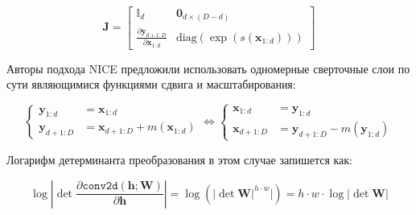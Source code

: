 \begin{equation}
    \mathbf{J} = 
    \begin{bmatrix}
    \mathbb{I}_d & \mathbf{0}_{d\times(D-d)} \\[5pt]
    \frac{\partial \mathbf{y}_{d+1:D}}{\partial \mathbf{x}_{1:d}} & \text{diag}(\exp(s(\mathbf{x}_{1:d})))
    \end{bmatrix}
\end{equation}

Авторы подхода NICE предложили использовать одномерные сверточные слои по сути являющимися функциями сдвига и масштабирования:

\begin{equation}
    \begin{cases}
    \mathbf{y}_{1:d} &= \mathbf{x}_{1:d} \\ 
    \mathbf{y}_{d+1:D} &= \mathbf{x}_{d+1:D} + m(\mathbf{x}_{1:d})
    \end{cases}
    \Leftrightarrow 
    \begin{cases}
    \mathbf{x}_{1:d} &= \mathbf{y}_{1:d} \\ 
    \mathbf{x}_{d+1:D} &= \mathbf{y}_{d+1:D} - m(\mathbf{y}_{1:d})
    \end{cases}
\end{equation}

Логарифм детерминанта преобразования в этом случае запишется как:

\begin{equation}
    \log \left\vert\det \frac{\partial\texttt{conv2d}(\mathbf{h}; \mathbf{W})}{\partial\mathbf{h}}\right\vert
    = \log (\vert\det\mathbf{W}\vert^{h \cdot w}\vert) = h \cdot w \cdot \log \vert\det\mathbf{W}\vert
\end{equation}



